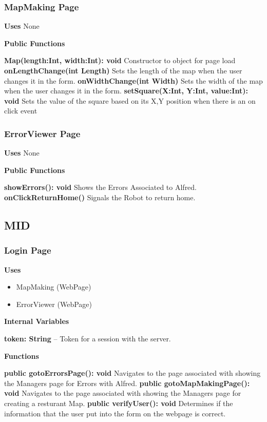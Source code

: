 \documentclass [10pt]{article}
\begin{document}
\subsubsection{MapMaking Page}
\textbf{Uses}
None

\textbf{Public Functions}

\textbf{ Map(length:Int, width:Int): void}
Constructor to object for page load
\textbf{onLengthChange(int Length)}
Sets the length of the map when the user changes it in the form.
\textbf{onWidthChange(int Width)}
Sets the width of the map when the user changes it in the form.
\textbf{setSquare(X:Int, Y:Int, value:Int): void}
Sets the value of the square based on its X,Y position when there is an on click event

\subsubsection{ErrorViewer Page}
\textbf{Uses}
None

\textbf{Public Functions}

\textbf{ showErrors(): void}
Shows the Errors Associated to Alfred.
\textbf{onClickReturnHome()}
Signals the Robot to return home.

\subsection{MID}

\subsubsection{Login Page}
\textbf{Uses}
\begin{itemize}
	\item MapMaking (WebPage)
	\item ErrorViewer (WebPage)
\end{itemize}


\textbf{Internal Variables}

\textbf{token: String} – Token for a session with the server.


\textbf{Functions}

\textbf{public gotoErrorsPage(): void}
Navigates to the page associated with showing the Managers page for Errors with Alfred.
\textbf{public gotoMapMakingPage(): void}
Navigates to the page associated with showing the Managers page for creating a resturant Map.
\textbf{public verifyUser(): void}
Determines if the information that the user put into the form on the webpage is correct.
\end{document}
